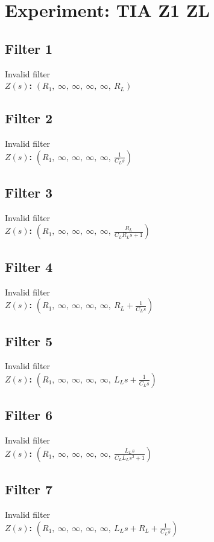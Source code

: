 \documentclass{article}
\begin{document}
        \section*{Experiment: TIA Z1 ZL}
\subsection*{Filter 1}
Invalid filter \\ 
\textbf{$Z(s)$:} $\left( R_{1}, \  \infty, \  \infty, \  \infty, \  \infty, \  R_{L}\right)$ \\ 
\subsection*{Filter 2}
Invalid filter \\ 
\textbf{$Z(s)$:} $\left( R_{1}, \  \infty, \  \infty, \  \infty, \  \infty, \  \frac{1}{C_{L} s}\right)$ \\ 
\subsection*{Filter 3}
Invalid filter \\ 
\textbf{$Z(s)$:} $\left( R_{1}, \  \infty, \  \infty, \  \infty, \  \infty, \  \frac{R_{L}}{C_{L} R_{L} s + 1}\right)$ \\ 
\subsection*{Filter 4}
Invalid filter \\ 
\textbf{$Z(s)$:} $\left( R_{1}, \  \infty, \  \infty, \  \infty, \  \infty, \  R_{L} + \frac{1}{C_{L} s}\right)$ \\ 
\subsection*{Filter 5}
Invalid filter \\ 
\textbf{$Z(s)$:} $\left( R_{1}, \  \infty, \  \infty, \  \infty, \  \infty, \  L_{L} s + \frac{1}{C_{L} s}\right)$ \\ 
\subsection*{Filter 6}
Invalid filter \\ 
\textbf{$Z(s)$:} $\left( R_{1}, \  \infty, \  \infty, \  \infty, \  \infty, \  \frac{L_{L} s}{C_{L} L_{L} s^{2} + 1}\right)$ \\ 
\subsection*{Filter 7}
Invalid filter \\ 
\textbf{$Z(s)$:} $\left( R_{1}, \  \infty, \  \infty, \  \infty, \  \infty, \  L_{L} s + R_{L} + \frac{1}{C_{L} s}\right)$ \\ 
\end{document}
